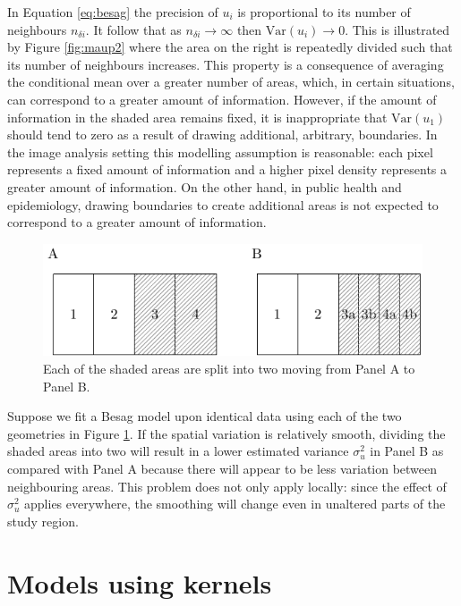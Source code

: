 \documentclass[a4paper, nobind]{templates/ociamthesis}
\begin{document}
In Equation \eqref{eq:besag} the precision of \(u_i\) is proportional to its number of neighbours \(n_{\delta i}\).
It follow that as \(n_{\delta i} \to \infty\) then \(\text{Var}(u_i) \to 0\).
This is illustrated by Figure \ref{fig:maup2} where the area on the right is repeatedly divided such that its number of neighbours increases.
This property is a consequence of averaging the conditional mean over a greater number of areas, which, in certain situations, can correspond to a greater amount of information.
However, if the amount of information in the shaded area remains fixed, it is inappropriate that \(\text{Var}(u_1)\) should tend to zero as a result of drawing additional, arbitrary, boundaries.
In the image analysis setting this modelling assumption is reasonable: each pixel represents a fixed amount of information and a higher pixel density represents a greater amount of information.
On the other hand, in public health and epidemiology, drawing boundaries to create additional areas is not expected to correspond to a greater amount of information.



\begin{figure}
\includegraphics[width=0.95\linewidth]{figures/beyond-borders/maup3} \caption{Each of the shaded areas are split into two moving from Panel A to Panel B.}\label{fig:maup3}
\end{figure}

Suppose we fit a Besag model upon identical data using each of the two geometries in Figure \ref{fig:maup3}.
If the spatial variation is relatively smooth, dividing the shaded areas into two will result in a lower estimated variance \(\sigma^2_u\) in Panel B as compared with Panel A because there will appear to be less variation between neighbouring areas.
This problem does not only apply locally: since the effect of \(\sigma^2_u\) applies everywhere, the smoothing will change even in unaltered parts of the study region.

\hypertarget{models-using-kernels}{%
\section{Models using kernels}\label{models-using-kernels}}
\end{document}
